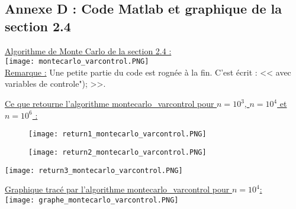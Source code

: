 \documentclass{article}
\theoremstyle{exostyle}
\begin{document}
\begin{appendices}

\setcounter{page}{1}
\section{Annexe D : Code Matlab et graphique de la section 2.4}

\bigbreak
\bigbreak

\hspace{-2.4cm}\underline{Algorithme de Monte Carlo de la section 2.4 :}\\

\hspace{-2.5cm}\texttt{[image: montecarlo\_varcontrol.PNG]}\\

\hspace{-2.4cm}\underline{Remarque :} Une petite partie du code est rognée à la fin. C'est écrit : << avec variables de controle"); >>.

\newpage

\underline{Ce que retourne l'algorithme montecarlo\_varcontrol pour $n = 10^{3}$, $n = 10^{4}$ et $n = 10^{6}$ :}

\begin{figure}[h]
    \begin{minipage}[c]{.46\linewidth}
        \centering
        \texttt{[image: return1\_montecarlo\_varcontrol.PNG]}
    \end{minipage}
    \hfill
    \begin{minipage}[c]{.46\linewidth}
        \centering
        \texttt{[image: return2\_montecarlo\_varcontrol.PNG]}
    \end{minipage}
\end{figure}


\texttt{[image: return3\_montecarlo\_varcontrol.PNG]}

\newpage

\hspace{-1.7cm}\underline{Graphique tracé par l'algorithme montecarlo\_varcontrol pour $n=10^{4}$:}\\

\hspace{-1.7cm}\texttt{[image: graphe\_montecarlo\_varcontrol.PNG]}
\end{appendices}


\newpage 
\end{document}
